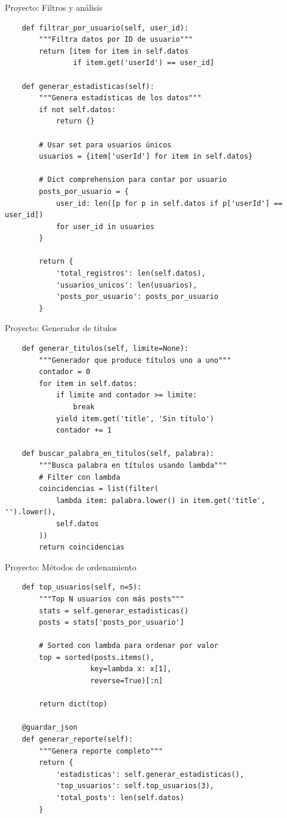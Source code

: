 \documentclass{beamer}
\begin{document}
\begin{frame}[fragile]{Proyecto: Filtros y análisis \faFilter}
\begin{lstlisting}
    def filtrar_por_usuario(self, user_id):
        """Filtra datos por ID de usuario"""
        return [item for item in self.datos 
                if item.get('userId') == user_id]
    
    def generar_estadisticas(self):
        """Genera estadísticas de los datos"""
        if not self.datos:
            return {}
        
        # Usar set para usuarios únicos
        usuarios = {item['userId'] for item in self.datos}
        
        # Dict comprehension para contar por usuario
        posts_por_usuario = {
            user_id: len([p for p in self.datos if p['userId'] == user_id])
            for user_id in usuarios
        }
        
        return {
            'total_registros': len(self.datos),
            'usuarios_unicos': len(usuarios),
            'posts_por_usuario': posts_por_usuario
        }
\end{lstlisting}
\end{frame}

\begin{frame}[fragile]{Proyecto: Generador de títulos \faRecycle}
\begin{lstlisting}
    def generar_titulos(self, limite=None):
        """Generador que produce títulos uno a uno"""
        contador = 0
        for item in self.datos:
            if limite and contador >= limite:
                break
            yield item.get('title', 'Sin título')
            contador += 1
    
    def buscar_palabra_en_titulos(self, palabra):
        """Busca palabra en títulos usando lambda"""
        # Filter con lambda
        coincidencias = list(filter(
            lambda item: palabra.lower() in item.get('title', '').lower(),
            self.datos
        ))
        return coincidencias
\end{lstlisting}
\end{frame}

\begin{frame}[fragile]{Proyecto: Métodos de ordenamiento \faSort}
\begin{lstlisting}
    def top_usuarios(self, n=5):
        """Top N usuarios con más posts"""
        stats = self.generar_estadisticas()
        posts = stats['posts_por_usuario']
        
        # Sorted con lambda para ordenar por valor
        top = sorted(posts.items(), 
                    key=lambda x: x[1], 
                    reverse=True)[:n]
        
        return dict(top)
    
    @guardar_json
    def generar_reporte(self):
        """Genera reporte completo"""
        return {
            'estadisticas': self.generar_estadisticas(),
            'top_usuarios': self.top_usuarios(3),
            'total_posts': len(self.datos)
        }
\end{lstlisting}
\end{frame}
\end{document}
